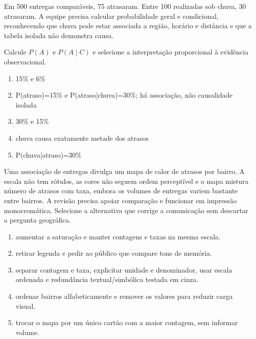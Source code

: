 
\TextoBase

Em 500 entregas comparáveis, 75 atrasaram. Entre 100 realizadas sob chuva, 30 atrasaram. A equipe precisa calcular probabilidade geral e condicional, reconhecendo que chuva pode estar associada a região, horário e distância e que a tabela isolada não demonstra causa.

\FonteDidatica

\Comando Calcule $P(A)$ e $P(A\mid C)$ e selecione a interpretação proporcional à evidência observacional.

\begin{enumerate}[label=\Alph*)]

\item 15\% e 6\%

\item P(atraso)=15\% e P(atraso|chuva)=30\%; há associação, não causalidade isolada

\item 30\% e 15\%

\item chuva causa exatamente metade dos atrasos

\item P(chuva|atraso)=30\%

\end{enumerate}

\TextoBase Uma associação de entregas divulga um mapa de calor de atrasos por bairro. A escala não tem rótulos, as cores não seguem ordem perceptível e o mapa mistura número de atrasos com taxa, embora os volumes de entregas variem bastante entre bairros. A revisão precisa apoiar comparação e funcionar em impressão monocromática.
\FonteDidatica
\Comando Selecione a alternativa que corrige a comunicação sem descartar a pergunta geográfica.
\begin{enumerate}[label=\Alph*)]
\item aumentar a saturação e manter contagens e taxas na mesma escala.
\item retirar legenda e pedir ao público que compare tons de memória.
\item separar contagem e taxa, explicitar unidade e denominador, usar escala ordenada e redundância textual/simbólica testada em cinza.
\item ordenar bairros alfabeticamente e remover os valores para reduzir carga visual.
\item trocar o mapa por um único cartão com a maior contagem, sem informar volume.
\end{enumerate}

